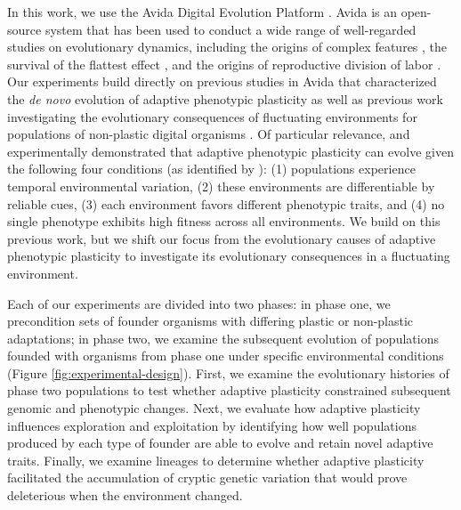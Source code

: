 In this work, we use the Avida Digital Evolution Platform \citep{ofria_avida:_2009}.
Avida is an open-source system that has been used to conduct a wide range of well-regarded studies on evolutionary dynamics, including 
the origins of complex features \citep{lenski_evolutionary_2003},
the survival of the flattest effect \citep{wilke_evolution_2001},
and the origins of reproductive division of labor \citep{goldsby_evolutionary_2014}.
Our experiments build directly on previous studies in Avida that characterized the \textit{de novo} evolution of adaptive phenotypic plasticity \citep{clune_investigating_2007,lalejini_evolutionary_2016} as well as previous work investigating the evolutionary consequences of fluctuating environments for populations of non-plastic digital organisms \citep{li_digital_2004,canino-koning_fluctuating_2019}.
Of particular relevance, \cite{clune_investigating_2007} and \cite{lalejini_evolutionary_2016} experimentally demonstrated that adaptive phenotypic plasticity can evolve given the following four conditions (as identified by \citealt{ghalambor_behavior_2010}):
(1) populations experience temporal environmental variation,
(2) these environments are differentiable by reliable cues,
(3) each environment favors different phenotypic traits,
and (4) no single phenotype exhibits high fitness across all environments.
We build on this previous work, but we shift our focus from the evolutionary causes of adaptive phenotypic plasticity to investigate its evolutionary consequences in a fluctuating environment.


Each of our experiments are divided into two phases: in phase one, we precondition sets of founder organisms with differing plastic or non-plastic adaptations;
in phase two, we examine the subsequent evolution of populations founded with organisms from phase one under specific environmental conditions (Figure \ref{fig:experimental-design}).
First, we examine the evolutionary histories of phase two populations to test whether adaptive plasticity constrained subsequent genomic and phenotypic changes. 
Next, we evaluate how adaptive plasticity influences exploration and exploitation by identifying how well populations produced by each type of founder are able to evolve and retain novel adaptive traits.
Finally, we examine lineages to determine whether adaptive plasticity facilitated the accumulation of cryptic genetic variation that would prove deleterious when the environment changed. 

